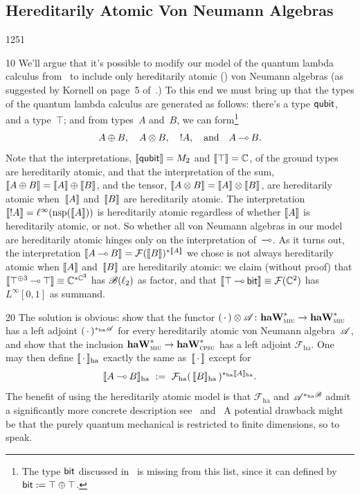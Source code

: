 \subsection{Hereditarily Atomic Von Neumann Algebras}
\begin{parsec}{1251}
\begin{point}{10}
We'll argue that it's possible to modify our model of the quantum lambda 
calculus from~\cite{model} to include only 
hereditarily atomic ()
von Neumann algebras
    (as suggested by Kornell on page~5 of~\cite{kornell2018quantum}.)
To this end
we must bring up that the types of the quantum lambda calculus
are generated as follows:
there's a type $\mathsf{qubit}$, and a type~$\top$;
and from types~$A$ and~$B$, we can form\footnote{The 
type $\mathsf{bit}$ discussed in~ is missing from this list,
since it can defined by $\mathsf{bit}:=\top\oplus\top$.}
\begin{equation*}
A\oplus B,\quad A\otimes B,\quad !A,\quad \text{and}\quad 
     A\mathbin{\multimap} B.
\end{equation*}
Note that 
the interpretations,
$\llbracket\mathsf{qubit}\rrbracket=M_2$
    and $\llbracket\top\rrbracket=\mathbb{C}$,
of the ground types
are hereditarily atomic,
and that the interpretation
of
the sum,
$\llbracket A\oplus B\rrbracket=\llbracket A\rrbracket\oplus\llbracket B\rrbracket$, and the tensor,
$\llbracket A\otimes B\rrbracket = \llbracket A\rrbracket\otimes \llbracket B\rrbracket$,
are hereditarily atomic
when~$\llbracket A\rrbracket$ and~$\llbracket B\rrbracket$ are hereditarily atomic.
The interpretation
$\llbracket!A\rrbracket = \ell^\infty(\mathrm{nsp}(\llbracket A\rrbracket))$
is hereditarily atomic regardless
of whether $\llbracket A\rrbracket$ is hereditarily atomic, or not.
So whether all von Neumann algebras
in our model are hereditarily atomic
hinges only on the interpretation
of~$\mathbin{\multimap}$.
As it turns out, 
the interpretation $\llbracket A\mathbin{\multimap} B\rrbracket = \mathcal{F}(\llbracket B\rrbracket)^{*\llbracket A\rrbracket}$
we chose is not always hereditarily atomic
when $\llbracket A\rrbracket$ and~$\llbracket B\rrbracket$
are hereditarily atomic:
    we claim (without proof) that
$\llbracket\top^{\oplus 3} \mathbin{\multimap} \top\rrbracket
\equiv \mathbb{C}^{*\mathbb{C}^3}$
has $\mathscr{B}(\ell_2)$  as factor,
and that $\llbracket\top\mathbin{\multimap} \mathsf{bit}\rrbracket\equiv\mathcal{F}(\mathbb{C}^2)$
has $L^\infty[0,1]$ as summand.
\end{point}
\begin{point}{20}
The solution is obvious:
show that the functor $(\,\cdot\,)\otimes \mathscr{A}\colon
\mathbf{haW}^*_{\text{\textsc{miu}}}\to\mathbf{haW}^*_{\text{\textsc{miu}}}$
has a left adjoint 
    $(\,\cdot\,)^{*_\mathrm{ha}\mathscr{A}}$
for every hereditarily atomic von Neumann 
algebra~$\mathscr{A}$,
and show that the inclusion $\mathbf{haW}^*_{\text{\textsc{miu}}}\to\mathbf{haW}^*_{\text{\textsc{cpsu}}}$
    has a left adjoint $\mathcal{F}_{\mathrm{ha}}$.
One may then define $\llbracket\,\cdot\,\rrbracket_\mathrm{ha}$
exactly the same as~$\llbracket\,\cdot\,\rrbracket$ except for
\begin{equation*}
    \llbracket A\mathbin{\multimap} B\rrbracket_{\mathrm{ha}}
    \ :=\ \mathcal{F}_\mathrm{ha}(\,
    \llbracket B\rrbracket_\mathrm{ha}\, )^{*_\mathrm{ha}\llbracket A\rrbracket_{\mathrm{ha}}}.
\end{equation*}
The benefit of using the hereditarily atomic model
is that
$\mathcal{F}_\mathrm{ha}$
and $\mathscr{A}^{*_\mathrm{ha}\mathscr{B}}$
admit a significantly more concrete
    description see~
    and~
A potential drawback might be that the purely quantum mechanical is restricted
to finite dimensions, so to speak.
\end{point}%
\end{parsec}%
